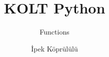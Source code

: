 
\usepackage{../KU-Beamer-Template/style/koc} 
\usepackage{minted}
\usepackage{upquote}
\usepackage{graphicx}

\title{KOLT Python}
\subtitle{Functions} 
\date{}
\author{İpek Köprülülü}


\makeatletter
\let\@@magyar@captionfix\relax
\makeatother

    \maketitle


